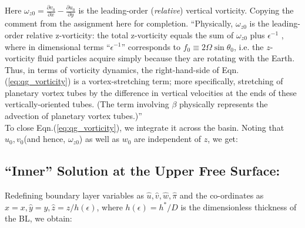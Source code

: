 \documentclass{article}
\newcommand{\pd}[2]{\frac{\partial{#1}}{\partial{#2}}}
\begin{document}
Here $\boxed{\omega_{z0} = \pd{v_{0}}{x} - \pd{u_{0}}{y}}$ is the leading-order (\textit{relative}) vertical vorticity. Copying the comment from the assignment here for completion.
``Physically, $\omega_{z0}$ is the leading-order relative z-vorticity: the total z-vorticity equals the sum of $\omega_{z0}$ plus $\epsilon^{-1}$ , where in dimensional terms ``$\epsilon^{-1}$''
corresponds to $f_{0} \equiv 2\Omega \sin{\theta_{0}}$, i.e. the $z$-vorticity fluid particles acquire simply because they are rotating with the Earth. Thus, in terms of vorticity dynamics, the right-hand-side of Eqn.(\ref{eq:qg_vorticity}) is a vortex-stretching term; more specifically, stretching of planetary vortex tubes by the difference in vertical velocities at the ends of these vertically-oriented tubes. (The term involving $\beta$ physically represents the advection of planetary vortex tubes.)''\\
%
To close Eqn.(\ref{eq:qg_vorticity}), we integrate it across the basin. Noting that $u_{0}, v_{0}$(and hence, $\omega_{z0}$) as well as $w_{0}$ are independent of $z$, we get:

\subsection{``Inner'' Solution at the Upper Free Surface:}
Redefining boundary layer variables as $\hat{u}, \hat{v}, \hat{w}, \hat{\pi}$ and the co-ordinates as $\hat{x} = x, \hat{y} = y, \hat{z}= z/h(\epsilon)$, where $h(\epsilon) = h^{*}/D$ is the dimensionless thickness of the BL, we obtain:
\end{document}
